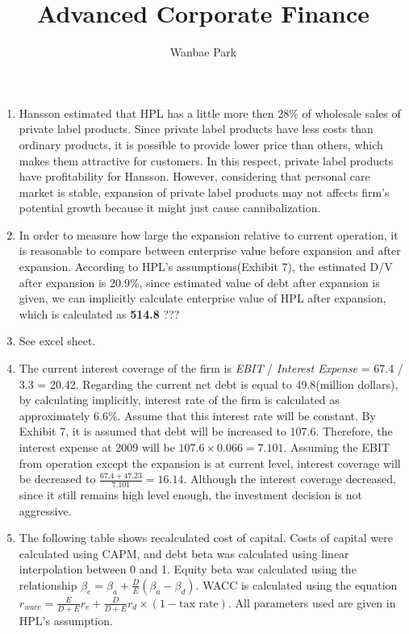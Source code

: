 \documentclass{article}
\author{Wanbae Park}
\date{}
\title{\textbf{Advanced Corporate Finance}}
\begin{document}
\maketitle
\begin{enumerate}
	\item
	Hansson estimated that HPL has a little more then 28\% of wholesale sales of private label products. Since private label products have less costs than ordinary products, it is possible to provide lower price than others, which makes them attractive for customers. In this respect, private label products have profitability for Hansson. However, considering that personal care market is stable, expansion of private label products may not affects firm's potential growth because it might just cause cannibalization.
	\item
	In order to measure how large the expansion relative to current operation, it is reasonable to compare between enterprise value before expansion and after expansion. According to HPL's assumptions(Exhibit 7), the estimated D/V after expansion is 20.9\%, since estimated value of debt after expansion is given, we can implicitly calculate enterprise value of HPL after expansion, which is calculated as \textbf{514.8} ??? 
	\item
	See excel sheet.
	\item
	The current interest coverage of the firm is \textit{EBIT} / \textit{Interest Expense} = 67.4 / 3.3 = 20.42. Regarding the current net debt is equal to 49.8(million dollars), by calculating implicitly, interest rate of the firm is calculated as approximately 6.6\%. Assume that this interest rate will be constant. By Exhibit 7, it is assumed that debt will be increased to 107.6. Therefore, the interest expense at 2009 will be $107.6 \times 0.066 = 7.101$. Assuming the EBIT from operation except the expansion is at current level, interest coverage will be decreased to $\frac{67.4 + 47.23}{7.101} = 16.14$. Although the interest coverage decreased, since it still remains high level enough, the investment decision is not aggressive.
	\item
	The following table shows recalculated cost of capital. Costs of capital were calculated using CAPM, and debt beta was calculated using linear interpolation between 0 and 1. Equity beta was calculated using the relationship $\beta_e = \beta_a + \frac{D}{E}(\beta_a - \beta_d)$. WACC is calculated using the equation $r_{wacc} = \frac{E}{D + E} r_e + \frac{D}{D + E} r_d \times (1 - \text{tax rate})$. All parameters used are given in HPL's assumption.

\end{enumerate}
\end{document}
